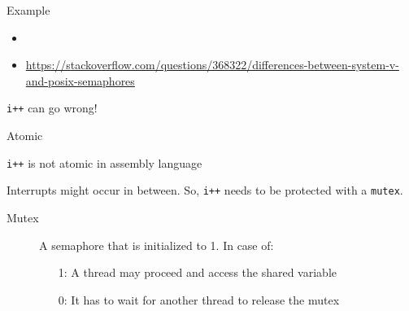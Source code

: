 \begin{frame}{Example}%
  \begin{center}
  \end{center}
\end{frame}

\begin{itemize}
\item {}
\item \url{https://stackoverflow.com/questions/368322/differences-between-system-v-and-posix-semaphores}
\end{itemize}

\begin{frame}{\texttt{i++} {\small can go wrong!}}
\begin{center}
\end{center}
\end{frame}

\begin{frame}{Atomic}
  \begin{iblock}{\texttt{i++} is not atomic in assembly language}
    \begin{center}
    \end{center}
  \end{iblock}
  Interrupts might occur in between. So, \texttt{i++} needs to be protected with a \texttt{mutex}.
\end{frame}

\begin{frame}
  \begin{description}
  \item[Mutex] A semaphore that is initialized to 1. In case of:
    \begin{itemize}
    \item[1:] A thread may proceed and access the shared variable
    \item[0:] It has to wait for another thread to release the mutex
    \end{itemize}
  \end{description}
  \begin{center}
  \end{center}
\end{frame}

